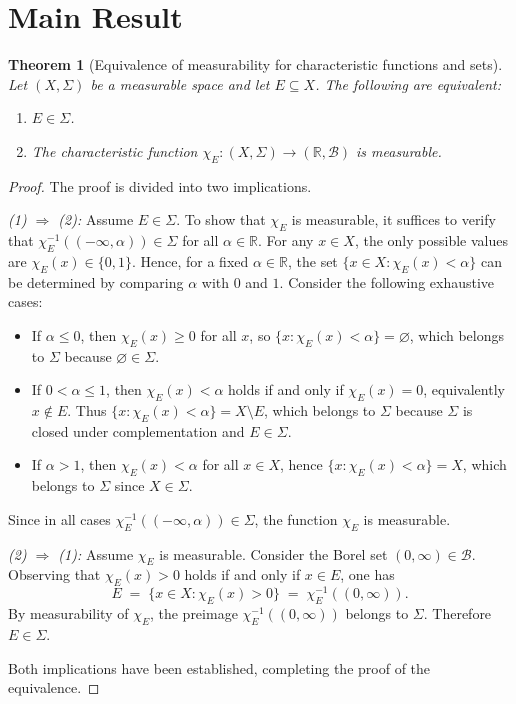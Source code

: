 \documentclass[12pt]{article}
\theoremstyle{plain}
\newtheorem{theorem}{Theorem}
\theoremstyle{definition}
\newcommand{\R}{\mathbb{R}}
\newcommand{\B}{\mathcal{B}}
\newcommand{\Sig}{\Sigma}
\begin{document}
\section*{Main Result}

\begin{theorem}[Equivalence of measurability for characteristic functions and sets]
Let \((X,\Sig)\) be a measurable space and let \(E \subseteq X\). The following are equivalent:
\begin{enumerate}
    \item \(E \in \Sig\).
    \item The characteristic function \(\chi_E: (X,\Sig) \to (\R,\B)\) is measurable.
\end{enumerate}
\end{theorem}

\begin{proof}
The proof is divided into two implications.

\medskip
\noindent
\emph{(1) \(\Rightarrow\) (2):} Assume \(E \in \Sig\). To show that \(\chi_E\) is measurable, it suffices to verify that \(\chi_E^{-1}((-\infty,\alpha)) \in \Sig\) for all \(\alpha \in \R\). For any \(x \in X\), the only possible values are \(\chi_E(x) \in \{0,1\}\). Hence, for a fixed \(\alpha \in \R\), the set \(\{x \in X : \chi_E(x) < \alpha\}\) can be determined by comparing \(\alpha\) with \(0\) and \(1\). Consider the following exhaustive cases:

\begin{itemize}
    \item If \(\alpha \le 0\), then \(\chi_E(x) \ge 0\) for all \(x\), so \(\{x : \chi_E(x) < \alpha\} = \varnothing\), which belongs to \(\Sig\) because \(\varnothing \in \Sig\).
    \item If \(0 < \alpha \le 1\), then \(\chi_E(x) < \alpha\) holds if and only if \(\chi_E(x)=0\), equivalently \(x \notin E\). Thus \(\{x : \chi_E(x) < \alpha\} = X \setminus E\), which belongs to \(\Sig\) because \(\Sig\) is closed under complementation and \(E \in \Sig\).
    \item If \(\alpha > 1\), then \(\chi_E(x) < \alpha\) for all \(x \in X\), hence \(\{x : \chi_E(x) < \alpha\} = X\), which belongs to \(\Sig\) since \(X \in \Sig\).
\end{itemize}

Since in all cases \(\chi_E^{-1}((-\infty,\alpha)) \in \Sig\), the function \(\chi_E\) is measurable.

\medskip
\noindent
\emph{(2) \(\Rightarrow\) (1):} Assume \(\chi_E\) is measurable. Consider the Borel set \((0,\infty) \in \B\). Observing that \(\chi_E(x) > 0\) holds if and only if \(x \in E\), one has
\[
E \;=\; \{x \in X : \chi_E(x) > 0\} \;=\; \chi_E^{-1}((0,\infty)).
\]
By measurability of \(\chi_E\), the preimage \(\chi_E^{-1}((0,\infty))\) belongs to \(\Sig\). Therefore \(E \in \Sig\).

\medskip
Both implications have been established, completing the proof of the equivalence.
\end{proof}
\end{document}
